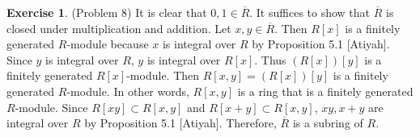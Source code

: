 \documentclass[12pt, psamsfonts]{amsart}
\theoremstyle{definition}
\newtheorem*{exer}{Exercise}
\theoremstyle{remark}
\numberwithin{equation}{section}
\begin{document}
\begin{exer}{(Problem 8)}
  It is clear that $0, 1 \in \overline{R}$.
  It suffices to show that $\overline{R}$ is closed under multiplication and addition.
  Let $x, y \in \overline{R}$.
  Then $R[x]$ is a finitely generated $R$-module because $x$ is integral over $R$ by Proposition 5.1 [Atiyah].
  Since $y$ is integral over $R$, $y$ is integral over $R[x]$.
  Thus $(R[x])[y]$ is a finitely generated $R[x]$-module.
  Then $R[x, y] = (R[x])[y]$ is a finitely generated $R$-module.
  In other words, $R[x, y]$ is a ring that is a finitely generated $R$-module.
  Since $R[xy] \subset R[x, y]$ and $R[x + y] \subset R[x, y]$, $xy, x + y$ are integral over $R$ by Proposition 5.1 [Atiyah].
  Therefore, $\overline{R}$ is a subring of $R$.
\end{exer}
\end{document}

